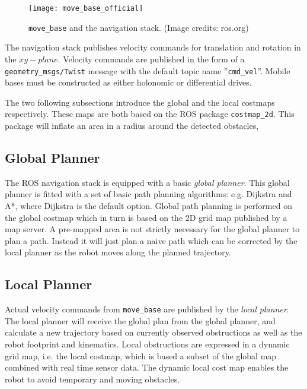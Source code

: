 \begin{figure}[h]
    \centering
    \texttt{[image: move\_base\_official]}
    \caption{\texttt{move\_base} and the navigation stack. (Image credits:  ros.org)}
    \label{fig:move_base_official}
\end{figure}

The navigation stack publishes velocity commands for translation and rotation in the $xy-plane$. Velocity commands are published in the form of a \texttt{geometry\_msgs/Twist} message with the default topic name ''\texttt{cmd\_vel}''. Mobile bases must be constructed as either holonomic or differential drives.

The two following subsections introduce the global and the local costmaps respectively. These maps are both based on the \ac{ROS} package \texttt{costmap\_2d}. This package will inflate an area in a radius around the detected obstacles, 

\subsection{Global Planner}

The \ac{ROS} navigation stack is equipped with a basic \textit{global planner}. This global planner is fitted with a set of basic path planning algorithms: e.g. Dijkstra and A*, where Dijkstra is the default option. Global path planning is performed on the global costmap which in turn is based on the 2D grid map published by a map server. A pre-mapped area is not strictly necessary for the global planner to plan a path. Instead it will just plan a naive path which can be corrected by the local planner as the robot moves along the planned trajectory.

\subsection{Local Planner}

Actual velocity commands from \texttt{move\_base} are published by the \textit{local planner}. The local planner will receive the global plan from the global planner, and calculate a new trajectory based on currently observed obstructions as well as the robot footprint and kinematics. Local obstructions are expressed in a dynamic grid map, i.e. the local costmap, which is based a subset of the global map combined with real time sensor data. The dynamic local cost map enables the robot to avoid temporary and moving obstacles.


